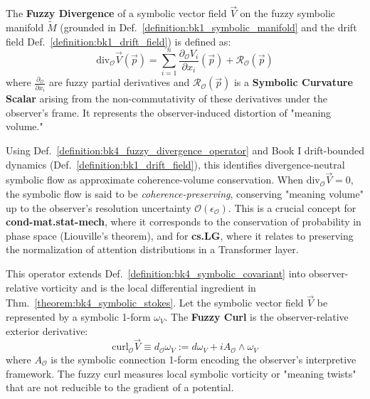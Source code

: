\begin{definition}
\label{definition:bk4_fuzzy_divergence_operator}
The \textbf{Fuzzy Divergence} of a symbolic vector field $\vec{V}$ on the fuzzy symbolic manifold $\tilde{M}$ (grounded in Def.~\ref{definition:bk1_symbolic_manifold} and the drift field Def.~\ref{definition:bk1_drift_field}) is defined as:
\[
\text{div}_{\mathcal{O}} \vec{V}(\vec{p}) = \sum_{i=1}^n \frac{\partial_{\mathcal{O}} V_i}{\partial x_i}(\vec{p}) + \mathcal{R}_{\mathcal{O}}(\vec{p})
\]
where $\frac{\partial_{\mathcal{O}}}{\partial x_i}$ are fuzzy partial derivatives and $\mathcal{R}_{\mathcal{O}}(\vec{p})$ is a \textbf{Symbolic Curvature Scalar} arising from the non-commutativity of these derivatives under the observer's frame. It represents the observer-induced distortion of "meaning volume."
\end{definition}

\begin{scholium}
\label{scholium:bk4_meaning_volume}
Using Def.~\ref{definition:bk4_fuzzy_divergence_operator} and Book I drift-bounded dynamics (Def.~\ref{definition:bk1_drift_field}), this identifies divergence-neutral symbolic flow as approximate coherence-volume conservation.
When $\text{div}_{\mathcal{O}} \vec{V} = 0$, the symbolic flow is said to be \emph{coherence-preserving}, conserving "meaning volume" up to the observer's resolution uncertainty $\mathcal{O}(\epsilon_{\mathcal{O}})$. This is a crucial concept for \textbf{cond-mat.stat-mech}, where it corresponds to the conservation of probability in phase space (Liouville's theorem), and for \textbf{cs.LG}, where it relates to preserving the normalization of attention distributions in a Transformer layer.
\end{scholium}

\begin{definition}
\label{definition:bk4_fuzzy_curl_operator}
This operator extends Def.~\ref{definition:bk4_symbolic_covariant} into observer-relative vorticity and is the local differential ingredient in Thm.~\ref{theorem:bk4_symbolic_stokes}.
Let the symbolic vector field $\vec{V}$ be represented by a symbolic 1-form $\omega_V$. The \textbf{Fuzzy Curl} is the observer-relative exterior derivative:
\[
\text{curl}_{\mathcal{O}} \vec{V} \equiv d_{\mathcal{O}} \omega_V := d\omega_V + i A_{\mathcal{O}} \wedge \omega_V
\]
where $A_{\mathcal{O}}$ is the symbolic connection 1-form encoding the observer's interpretive framework. The fuzzy curl measures local symbolic vorticity or "meaning twists" that are not reducible to the gradient of a potential.
\end{definition}

